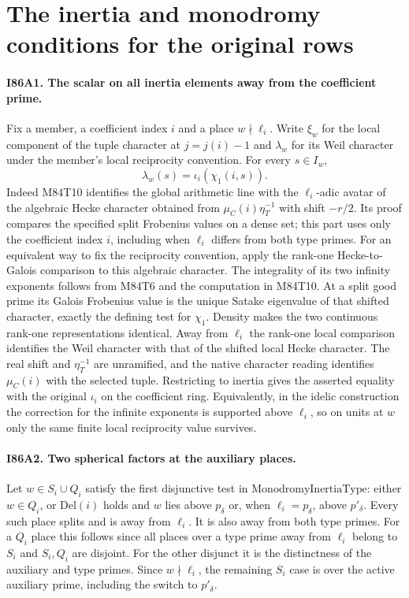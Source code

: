 \section{The inertia and monodromy conditions for the original rows}

\paragraph{I86A1. The scalar on all inertia elements away from the coefficient prime.}
Fix a member, a coefficient index $i$ and a place $w\nmid\ell_i$.
Write $\xi_w$ for the local component of the tuple character at
$j=j(i)-1$ and $\lambda_w$ for its Weil character under the
member's local reciprocity convention. For every $s\in I_w$,
\[
                  \lambda_w(s)=\iota_i(\chi_1(i,s)).
\]
Indeed M84T10 identifies the global arithmetic line with the
$\ell_i$-adic avatar of the algebraic Hecke character obtained
from $\mu_C(i)\eta_T^{-1}$ with shift $-r/2$. Its proof compares
the specified split Frobenius values on a dense set; this part
uses only the coefficient index $i$, including when $\ell_i$
differs from both type primes. For an equivalent way to fix the
reciprocity convention, apply the rank-one Hecke-to-Galois
comparison to this algebraic character. The integrality of its
two infinity exponents follows from M84T6 and the computation
in M84T10. At a split good prime its Galois Frobenius value is
the unique Satake eigenvalue of that shifted character, exactly
the defining test for $\chi_1$. Density makes the two continuous
rank-one representations identical. Away from $\ell_i$ the
rank-one local comparison identifies the Weil character with
that of the shifted local Hecke character. The real shift and
$\eta_T^{-1}$ are unramified, and the native character reading
identifies $\mu_C(i)$ with the selected tuple. Restricting to
inertia gives the asserted equality with the original $\iota_i$
on the coefficient ring. Equivalently, in the idelic construction
the correction for the infinite exponents is supported above
$\ell_i$, so on units at $w$ only the same finite local
reciprocity value survives.

\paragraph{I86A2. Two spherical factors at the auxiliary places.}
Let $w\in S_i\cup Q_i$ satisfy the first disjunctive test in
$\mathrm{MonodromyInertiaType}$: either $w\in Q_i$, or
$\mathrm{Del}(i)$ holds and $w$ lies above $p_\delta$ or,
when $\ell_i=p_\delta$, above $p'_\delta$. Every such place
splits and is away from $\ell_i$. It is also away from both
type primes. For a $Q_i$ place this follows since all places over
a type prime away from $\ell_i$ belong to $S_i$ and $S_i,Q_i$
are disjoint. For the other disjunct it is the distinctness of
the auxiliary and type primes. Since $w\nmid\ell_i$, the
remaining $S_i$ case is over the active auxiliary prime, including
the switch to $p'_\delta$.

